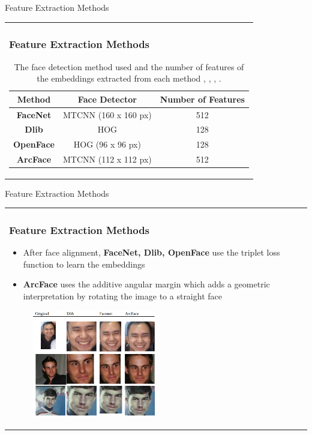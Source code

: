 \documentclass[11pt]{beamer}
\begin{document}
\begin{frame}{Feature Extraction Methods}
\begin{tabular}{l}
\parbox{1\linewidth}{
\frametitle{Feature Extraction Methods}

\begin{table}[H]
\centering
\begin{tabular}{||c c c||} 
 \hline
  Method & Face Detector & Number of Features\\ [0.5ex]
 \hline\hline
 \textbf{FaceNet} & MTCNN (160 x 160 px) & 512\\ 
 \hline
 \textbf{Dlib} & HOG & 128\\
 \hline
 \textbf{OpenFace} & HOG (96 x 96 px) & 128\\
 \hline
 \textbf{ArcFace} & MTCNN (112 x 112 px) & 512\\
 \hline
\end{tabular}
\caption{The face detection method used and the number of features of the embeddings extracted from each method \cite{sandberg}, \cite{geitgey}, \cite{amos2016}, \cite{deng2019}.}
\label{table:1}
\end{table}
}
\end{tabular}  
\end{frame}

\begin{frame}{Feature Extraction Methods}
\begin{tabular}{l}
\parbox{1\linewidth}{
\frametitle{Feature Extraction Methods}
\begin{itemize}
\item After face alignment, \textbf{FaceNet, Dlib, OpenFace} use the triplet loss function to learn the embeddings
\item \textbf{ArcFace} uses the additive angular margin which adds a geometric interpretation by rotating the image to a straight face
\end{itemize}

\begin{figure}[!tbp]
 \centering
    \includegraphics[width=0.5\textwidth]{figures/comparison.png}
	\label{fig:arcface1}
\end{figure}
}
\end{tabular}  
\end{frame}
\end{document}
